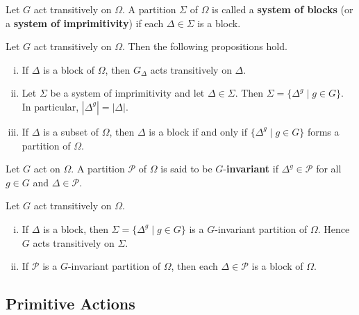 \begin{definition}
	Let $G$ act transitively on $\Omega$. A partition $\Sigma$ of $\Omega$ is called a \textbf{system of blocks} (or a \textbf{system of imprimitivity}) if each $\Delta\in \Sigma$ is a block.
\end{definition}
\begin{proposition}
	Let $G$ act transitively on $\Omega$.  Then the following propositions hold.
	\begin{enumerate}[(i)]
		\item If $\Delta$ is a block of $\Omega$, then $G_{\Delta}$ acts transitively on $\Delta$. 
		\item Let $\Sigma$ be a system of imprimitivity and let $\Delta\in \Sigma$. Then
		$\Sigma  = \{\Delta^g\mid g\in G\}$. In particular, $|\Delta^g| = |\Delta|$.
		\item If $\Delta$ is a subset of $\Omega$, then $\Delta$ is a block if and only if $\{\Delta^g\mid g\in G\}$ forms a partition of $\Omega$.
	\end{enumerate}  
\end{proposition}
\begin{sketch}
	
\end{sketch}

\begin{definition}
	Let $G$ act on $\Omega$. A partition $\mathcal{P}$ of $\Omega$ is said to be $G$-\textbf{invariant} if $\Delta^g \in\mathcal{P}$ for all $g\in G$ and $\Delta\in\mathcal{P}$.
\end{definition}
\begin{proposition}
	Let $G$ act transitively on $\Omega$.
	\begin{enumerate}[(i)]
		\item  If  $\Delta$ is a block, then $\Sigma = \{\Delta^g\mid g\in G\}$ is a $G$-invariant partition of $\Omega$. Hence $G$ acts transitively on $\Sigma$.
		\item If $\mathcal{P}$ is a $G$-invariant partition of $\Omega$, then each $\Delta\in \mathcal{P}$ is a block of $\Omega$.
	\end{enumerate}
\end{proposition}
\begin{sketch}
	
\end{sketch}

\subsection{Primitive Actions}

